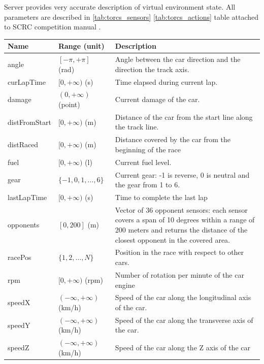 \documentclass[declaration,shortabstract,english,inz]{iithesis}
\begin{document}
Server provides very accurate description of virtual environment state. All parameters are described in \ref{tab:torcs_sensors} \ref{tab:torcs_actions} table attached to SCRC competition manual \cite{scrc_manual}. 

\begin{center}
    \begin{longtable}{ | p{} |p{}| p{} |}
     \hline
     \textbf{Name} & \textbf{Range (unit)} & \textbf{Description} \\ 
     \hline
     angle & $[-\pi, +\pi]$ (rad) & Angle between the car direction and the direction the track axis. \\  
     \hline
     curLapTime & $[0, +\infty)$ (s) & Time elapsed during current lap. \\
     \hline
     damage & $(0, +\infty)$ (point) & Current damage of the car. \\
     \hline
     distFromStart & $[0, +\infty)$ (m) & Distance of the car from the start line along the track line. \\
     \hline
     distRaced & $[0, +\infty)$ (m) & Distance covered by the car from the beginning of the race \\
     \hline
     fuel & $[0, +\infty)$ (l) & Current fuel level. \\
     \hline
     gear & $ \{ -1,0,1, \dots, 6 \} $ & Current gear: -1 is reverse, 0 is neutral and the gear from 1 to 6. \\
     \hline
     lastLapTime & $[0, +\infty)$ (s) & Time to complete the last lap \\
     \hline
     opponents & $[0, 200]$ (m) & Vector of 36 opponent sensors: each sensor covers a span of 10 degrees within a range of 200 meters and returns the distance of the closest opponent in the covered area. \\
     \hline
     racePos & $\{1,2,\dots,N\}$ & Position in the race with respect to other cars. \\
     \hline
     rpm & $[0, +\infty)$ (rpm) & Number of rotation per minute of the car engine \\
     \hline
     speedX & $ ( -\infty, +\infty ) $ (km/h) & Speed of the car along the longitudinal axis of the car. \\
     \hline
     speedY & $ ( -\infty, +\infty ) $ (km/h) & Speed of the car along the transverse axis of the car. \\
     \hline
     speedZ & $ ( -\infty, +\infty ) $ (km/h) & Speed of the car along the Z axis of the car \\

\end{longtable}
\end{center}
\end{document}
